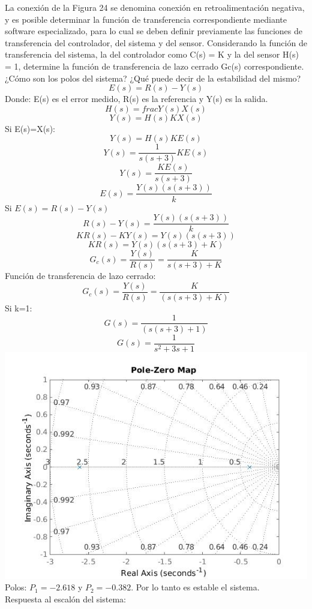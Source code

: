 La conexión de la Figura 24 se denomina conexión en retroalimentación negativa, y es posible determinar la función de transferencia correspondiente mediante software especializado, para lo cual se deben definir
previamente las funciones de transferencia del controlador, del sistema y del sensor. Considerando la función de transferencia del sistema, la del controlador como C(s) = K y la del sensor H(s) = 1, determine
la función de transferencia de lazo cerrado Gc(s) correspondiente. ¿Cómo son los polos del sistema? ¿Qué puede decir de la estabilidad del mismo?
$$E(s)=R(s)-Y(s)$$
Donde: E(s) es el error medido, R(s) es la referencia y Y(s) es la salida.
$$H(s)=frac{Y(s)}{X(s)}$$
$$Y(s)=H(s)KX(s)$$
Si E(s)=X(s):
$$Y(s)=H(s)KE(s)$$
$$Y(s)=\frac{1}{s(s+3)}KE(s)$$
$$Y(s)=\frac{KE(s)}{s(s+3)}$$
$$E(s)=\frac{Y(s)(s(s+3))}{k}$$
Si $E(s)=R(s)-Y(s)$
$$R(s)-Y(s)=\frac{Y(s)(s(s+3))}{k}$$
$$KR(s)-KY(s)=Y(s)(s(s+3))$$
$$KR(s)=Y(s)(s(s+3)+K)$$
$$G_{c}(s)=\frac{Y(s)}{R(s)}=\frac{K}{s(s+3)+K}$$
Función de transferencia de lazo cerrado:
$$G_{c}(s)=\frac{Y(s)}{R(s)}=\frac{K}{(s(s+3)+K)}$$	
Si k=1:
$$G(s)=\frac{1}{(s(s+3)+1)}$$	
$$G(s)=\frac{1}{s^{2}+3s+1}$$	
\includegraphics[scale=0.5]{./img2/G3.jpg}\\ 
Polos: $P_{1}=-2.618$ y $P_{2}=-0.382$. Por lo tanto es estable el sistema.\\
Respuesta al escalón del sistema:\\
